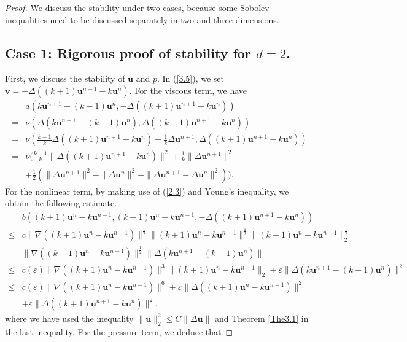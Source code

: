 \documentclass[10pt]{article}
\begin{document}
	\begin{proof}
		We discuss the stability under two cases, because some Sobolev inequalities need to be discussed separately in two and three dimensions.
		\subsection*{Case 1: Rigorous proof of  stability for \(d = 2\).}
		First, we discuss the stability of $\bm{u}$ and $p$. In (\ref{3.5}), we set $\bm{v} = -\Delta\left((k + 1)\bm{u}^{n+1} - k \bm{u}^n\right)$. For the viscous term, we have
		\begin{align}\label{3.13}
			&a(k\bm{u}^{n+1}-(k-1)\bm{u}^n,-\Delta((k+1)\bm{u}^{n+1}-k\bm{u}^n))\nonumber\\
			= &\nu(\Delta(k\bm{u}^{n+1}-(k-1)\bm{u}^n),\Delta((k+1)\bm{u}^{n+1}-k\bm{u}^n))\nonumber\\
			= &\nu(\frac{k-1}{k}\Delta((k+1)\bm{u}^{n+1}-k\bm{u}^n)+\frac{1}{k}\Delta\bm{u}^{n+1},\Delta((k+1)\bm{u}^{n+1}-k\bm{u}^n))\nonumber\\
			= &\nu(\frac{k-1}{k}\|\Delta((k+1)\bm{u}^{n+1}-k\bm{u}^n)\|^2+\frac{1}{k}\|\Delta\bm{u}^{n+1}\|^2\nonumber\\
			&+\frac{1}{2}(\|\Delta\bm{u}^{n+1}\|^2-\|\Delta\bm{u}^n\|^2+\|\Delta\bm{u}^{n+1}-\Delta\bm{u}^n\|^2)).
		\end{align}
		For the nonlinear term, by making use of (\ref{2.3}) and Young’s inequality, we obtain the following estimate.
		{ 
		\begin{align}\label{3.14}
			&b((k+1)\bm{u}^n-k\bm{u}^{n-1},(k+1)\bm{u}^n-k\bm{u}^{n-1},-\Delta((k+1)\bm{u}^{n+1}-k\bm{u}^n))\nonumber\\
			\leq & c\|\nabla((k+1)\bm{u}^n-k\bm{u}^{n-1})\|^\frac{1}{2}\|(k+1)\bm{u}^n-k\bm{u}^{n-1}\|^{\frac{1}{2}}\|(k+1)\bm{u}^n-k\bm{u}^{n-1}\|^\frac{1}{2}_2\nonumber\\
			&\|\nabla((k+1)\bm{u}^n-k\bm{u}^{n-1})\|^\frac{1}{2}\|\Delta(k\bm{u}^{n+1}-(k-1)\bm{u}^n)\|\nonumber\\
			\leq & c(\varepsilon)\|\nabla((k+1)\bm{u}^n-k\bm{u}^{n-1})\|^3\|(k+1)\bm{u}^n-k\bm{u}^{n-1}\|_2 +\varepsilon\|\Delta(k\bm{u}^{n+1}-(k-1)\bm{u}^n)\|^2\nonumber\\
			\leq & c(\varepsilon) \|\nabla((k+1)\bm{u}^n-k\bm{u}^{n-1})\|^6+\varepsilon\|\Delta((k+1)\bm{u}^n-k\bm{u}^{n-1})\|^2 \nonumber\\
			&  +\varepsilon\|\Delta((k+1)\bm{u}^{n+1}-k\bm{u}^n)\|^2,
		\end{align}
	}where we have used the inequality \( \| \bm{u}\|_2^2 \leq C \|\Delta \bm{u}\|  \) and Theorem \ref{The3.1} in the last inequality.  For the pressure term, we deduce that

\end{proof}
\end{document}
